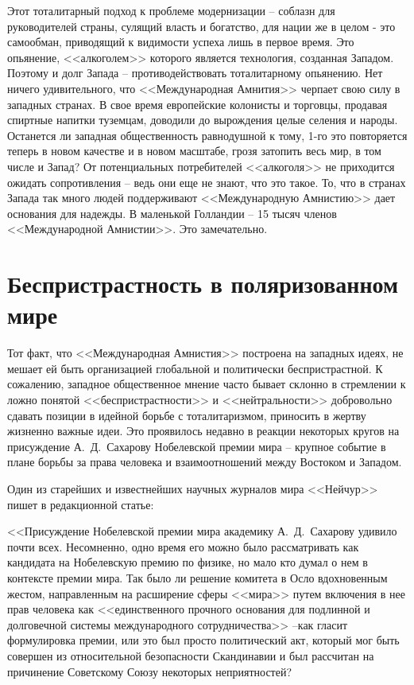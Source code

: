 \documentclass{book}
\begin{document}
Этот тоталитарный подход к проблеме модернизации -- со­блазн для руководителей страны, сулящий власть и богатство, для нации же в целом - это самообман, приводящий к види­мости успеха лишь в первое время. Это опьянение, <<алкого­лем>> которого является технология, созданная Западом. Поэто­му и долг Запада -- противодействовать тоталитарному опья­нению. Нет ничего удивительного, что <<Международная Амнития>> черпает свою силу в западных странах. В свое время евро­пейские колонисты и торговцы, продавая спиртные напитки туземцам, доводили до вырождения целые селения и народы. Останется ли западная общественность равнодушной к тому, 1-го это повторяется теперь в новом качестве и в новом мас­штабе, грозя затопить весь мир, в том числе и Запад? От потен­циальных потребителей <<алкоголя>> не приходится ожидать сопротивления -- ведь они еще не знают, что это такое.
То, что в странах Запада так много людей поддерживают <<Международную Амнистию>> дает основания для надежды. В маленькой Голландии -- 15 тысяч членов <<Международной Амнистии>>. Это замечательно.


\section{Беспристрастность в поляризованном мире}

Тот факт, что <<Международная Амнистия>> построена на за­падных идеях, не мешает ей быть организацией глобальной и политически беспристрастной. К сожалению, западное обще­ственное мнение часто бывает склонно в стремлении к ложно понятой <<беспристрастности>> и <<нейтральности>> добровольно сдавать позиции в идейной борьбе с тоталитаризмом, прино­сить в жертву жизненно важные идеи. Это проявилось недавно в реакции некоторых кругов на присуждение А.~Д.~Сахарову Нобелевской премии мира -- крупное событие в плане борьбы за права человека и взаимоотношений между Востоком и За­падом.

Один из старейших и известнейших научных журналов ми­ра <<Нейчур>> пишет в редакционной статье:

<<Присуждение Нобелевской премии мира академику А.~Д.~Сахарову удивило почти всех. Несомненно, одно время его можно было рассматривать как кандидата на Нобелевскую премию по физике, но мало кто думал о нем в контексте премии мира. Так было ли решение комитета в Осло вдохновенным жестом, направленным на расширение сферы <<мира>> путем включения в нее прав человека как <<единственного прочного основания для подлинной и долговечной системы международного сотрудничества>> --как гласит формулировка премии, или это был просто политический акт, который мог быть совершен из относительной безопасности Скандинавии и был рассчитан на причинение Советскому Союзу некоторых неприятностей?
\end{document}
